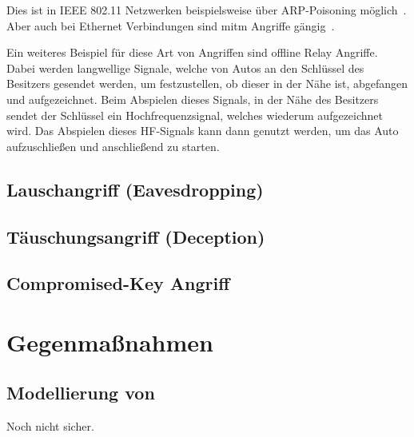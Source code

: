 \documentclass[final,bibliography=totocnumbered]{include/sikseminar}
\begin{document}
Dies ist in IEEE 802.11 Netzwerken beispielsweise über ARP-Poisoning möglich~\cite{FIT+2012}.
Aber auch bei Ethernet Verbindungen sind \gls{mitm} Angriffe gängig~\cite{HLL+17}.

Ein weiteres Beispiel für diese Art von Angriffen sind offline Relay Angriffe.
Dabei werden langwellige Signale, welche von Autos an den Schlüssel des Besitzers gesendet werden, um festzustellen, ob dieser in der Nähe ist, abgefangen und aufgezeichnet.
Beim Abspielen dieses Signals, in der Nähe des Besitzers sendet der Schlüssel ein Hochfrequenzsignal, welches wiederum aufgezeichnet wird.
Das Abspielen dieses HF-Signals kann dann genutzt werden, um das Auto aufzuschließen und anschließend zu starten.~\cite{HLL+17}

\subsection{Lauschangriff (Eavesdropping)}\label{subsec:lauschen} %

\subsection{T\"auschungsangriff (Deception)}\label{subsec:tauschung} %




\subsection{Compromised-Key Angriff}\label{subsec:key}


\section{Gegenmaßnahmen}\label{sec:gegenmassnahmen}




\subsection{Modellierung von }\label{subsec:modellierung}
Noch nicht sicher.
\end{document}
